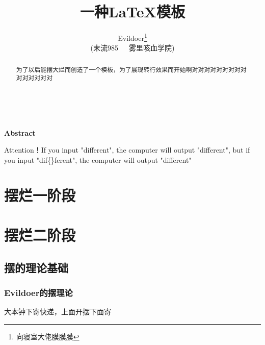 \documentclass[12pt,a4paper]{article}%
\title{\fontsize{18pt}{27pt}\selectfont%
	{\heiti%
		一种\LaTeX 模板}}%
\author{\fontsize{12pt}{18pt}\selectfont%
	{\fangsong%
		Evildoer}\thanks{向寝室大佬膜膜膜}\\%
	\fontsize{10.5pt}{15.75pt}\selectfont%
	{\fangsong%
		(末流985~~~雾里咳血学院)}}%
\date{}%
\begin{document}
	\maketitle%
	
	
	\lhead{}%
	\chead{}%
	\rhead{}%
	\lfoot{}%
	\cfoot{\thepage}%
	\rfoot{}%
	
	
	\begin{abstract}
		\fangsong 为了以后能摆大烂而创造了一个模板，为了展现转行效果而开始啊对对对对对对对对对对对对对对对
	\end{abstract}
	
	\begin{adjustwidth}{1.06cm}{1.06cm}
		\fontsize{10.5pt}{15.75pt}\\
	\end{adjustwidth}
	
	\begin{center}%
		{\textbf{Abstract}}%
	\end{center}
	\begin{adjustwidth}{1.06cm}{1.06cm}%
		\hspace{1.5em}Attention！If you input "dif{}ferent", the computer will output "different", but if you input "dif\{\}ferent", the computer will output "dif{}ferent"
	\end{adjustwidth}
	\newpage%
	
	
	
	
	
	\section{摆烂一阶段}
	
	\section{摆烂二阶段}
	
	\subsection{摆的理论基础}
	\subsubsection{Evildoer的摆理论}
	大本钟下寄快递，上面开摆下面寄
\end{document}
